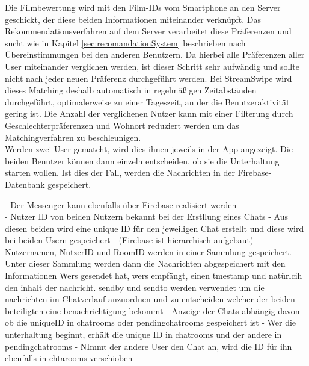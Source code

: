 Die Filmbewertung wird mit den Film-IDs vom Smartphone an den Server geschickt, der diese beiden Informationen miteinander verknüpft. Das Rekommendationsverfahren auf dem Server verarbeitet diese Präferenzen und sucht wie in Kapitel \ref{sec:recomandationSystem} beschrieben nach Übereinstimmungen bei den anderen Benutzern. Da hierbei alle Präferenzen aller User miteinander verglichen werden, ist dieser Schritt sehr aufwändig und sollte nicht nach jeder neuen Präferenz durchgeführt werden. Bei StreamSwipe wird dieses Matching deshalb automatisch in regelmäßigen Zeitabständen durchgeführt, optimalerweise zu einer Tageszeit, an der die Benutzeraktivität gering ist. Die Anzahl der verglichenen Nutzer kann mit einer Filterung durch Geschlechterpräferenzen und Wohnort reduziert werden um das Matchingverfahren zu beschleunigen. \\
Werden zwei User gematcht, wird dies ihnen jeweils in der App angezeigt. Die beiden Benutzer können dann einzeln entscheiden, ob sie die Unterhaltung starten wollen. Ist dies der Fall, werden die Nachrichten in der Firebase-Datenbank gespeichert. %



- Der Messenger kann ebenfalls über Firebase realisiert werden\\ %

- Nutzer ID von beiden Nutzern bekannt bei der  Erstllung eines Chats
- Aus diesen beiden wird eine unique ID für den jeweiligen Chat erstellt und diese wird bei beiden Usern gespeichert
- (Firebase ist hierarchisch aufgebaut) Nutzernamen, NutzerID und RoomID werden in einer Sammlung gespeichert. Unter dieser Sammlung werden dann die Nachrichten abgespeichert mit den Informationen Wers gesendet hat, wers empfängt, einen tmestamp und natürlcih den inhalt der nachricht. sendby und sendto werden verwendet um die nachrichten im Chatverlauf anzuordnen und zu entscheiden welcher der beiden beteiligten eine benachrichtigung bekommt
- Anzeige der Chats abhängig davon ob die uniqueID in chatrooms oder pendingchatrooms gespeichert ist
- Wer die unterhaltung beginnt, erhält die unique ID in chatrooms und der andere in pendingchatrooms
- NImmt der andere User den Chat an, wird die ID für ihn ebenfalls in chtarooms verschioben
- 


